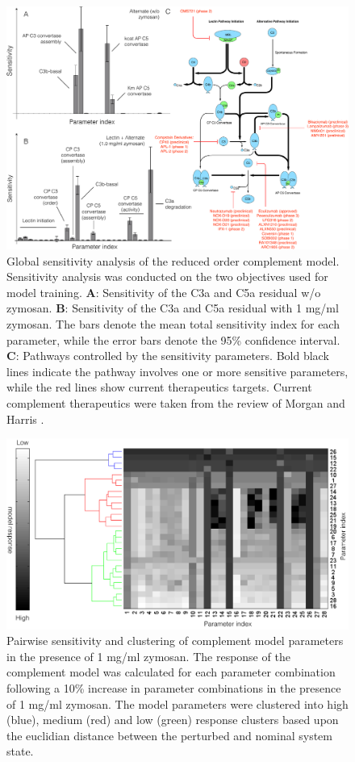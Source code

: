 \documentclass[12pt]{article}
\begin{document}
\begin{figure}[ht]
\centering
\includegraphics[width=1.1\textwidth]{./figs/Figure4_Sensitivity_v3.pdf}
\caption{Global sensitivity analysis of the reduced order complement model.
Sensitivity analysis was conducted on the two objectives used for model training.
\textbf{A}: Sensitivity of the C3a and C5a residual w/o zymosan.
\textbf{B}: Sensitivity of the C3a and C5a residual with 1 mg/ml zymosan.
The bars denote the mean total sensitivity index for each parameter, while the error bars denote the 95\% confidence interval.
\textbf{C}: Pathways controlled by the sensitivity parameters.
Bold black lines indicate the pathway involves one or more sensitive parameters, while the red lines show current therapeutics targets.
Current complement therapeutics were taken from the review of Morgan and Harris \cite{morgan2015complement}. }\label{fig-SA}
\end{figure}

\begin{figure}[ht]
\centering
\includegraphics[width=1.0\textwidth]{./figs/Figure5_PairwiseSensitivity_v1.pdf}
\caption{Pairwise sensitivity and clustering of complement model parameters in the presence of 1 mg/ml zymosan.
The response of the complement model was calculated for each parameter combination following a 10\% increase in parameter combinations in the presence of 1 mg/ml zymosan.
The model parameters were clustered into high (blue), medium (red) and low (green) response clusters based upon the euclidian distance between the perturbed and nominal system state.
}\label{fig-pairwise-analysis}
\end{figure}
\end{document}
